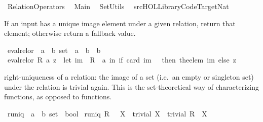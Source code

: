 %
\begin{isabellebody}%
\def\isabellecontext{RelationOperators}%
%
\isamarkuptrue%
%
\isadelimtheory
%
\endisadelimtheory
%
\isatagtheory
{}\isamarkupfalse%
\ RelationOperators\isanewline
{}\isanewline
\ \ Main\isanewline
\ \ SetUtils\isanewline
\ \ {\isachardoublequoteopen}{\isachartilde}{\isachartilde}{\isacharslash}src{\isacharslash}HOL{\isacharslash}Library{\isacharslash}Code{\isacharunderscore}Target{\isacharunderscore}Nat{\isachardoublequoteclose}\isanewline
\isanewline
{}%
\endisatagtheory
{\isafoldtheory}%
%
\isadelimtheory
%
\endisadelimtheory
%
\isamarkuptrue%
%
\begin{isamarkuptext}%
If an input has a unique image element under a given relation, return that element; 
  otherwise return a fallback value.%
\end{isamarkuptext}%
\isamarkuptrue%
\isamarkupfalse%
\ eval{\isacharunderscore}rel{\isacharunderscore}or\ {\isacharcolon}{\isacharcolon}\ {\isachardoublequoteopen}{\isacharparenleft}{\isacharprime}a\ {\isasymtimes}\ {\isacharprime}b{\isacharparenright}\ set\ {\isasymRightarrow}\ {\isacharprime}a\ {\isasymRightarrow}\ {\isacharprime}b\ {\isasymRightarrow}\ {\isacharprime}b{\isachardoublequoteclose}\isanewline
{}\ {\isachardoublequoteopen}eval{\isacharunderscore}rel{\isacharunderscore}or\ R\ a\ z\ {\isacharequal}\ {\isacharparenleft}let\ im\ {\isacharequal}\ R\ {\isacharbackquote}{\isacharbackquote}\ {\isacharbraceleft}a{\isacharbraceright}\ in\ if\ card\ im\ {\isacharequal}\ {}\ then\ the{\isacharunderscore}elem\ im\ else\ z{\isacharparenright}{\isachardoublequoteclose}%
\begin{isamarkuptext}%
right-uniqueness of a relation: the image of a  set (i.e.\ an empty or
  singleton set) under the relation is trivial again. 
This is the set-theoretical way of characterizing functions, as opposed to \isa{{\isasymlambda}} functions.%
\end{isamarkuptext}%
\isamarkuptrue%
\isamarkupfalse%
\ runiq\ {\isacharcolon}{\isacharcolon}\ {\isachardoublequoteopen}{\isacharparenleft}{\isacharprime}a\ {\isasymtimes}\ {\isacharprime}b{\isacharparenright}\ set\ {\isasymRightarrow}\ bool{\isachardoublequoteclose}\ \isanewline
{\isachardoublequoteopen}runiq\ R\ {\isacharequal}\ {\isacharparenleft}{\isasymforall}\ X\ {\isachardot}\ trivial\ X\ {\isasymlongrightarrow}\ trivial\ {\isacharparenleft}R\ {\isacharbackquote}{\isacharbackquote}\ X{\isacharparenright}{\isacharparenright}{\isachardoublequoteclose}%

\end{isabellebody}
